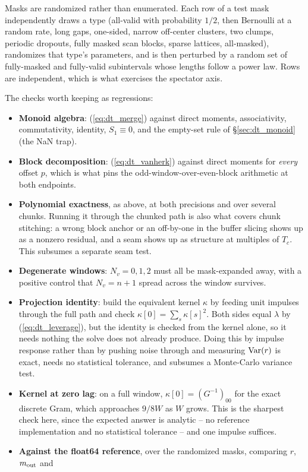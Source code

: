\documentclass{article}
\numberwithin{equation}{section}   %
\begin{document}
Masks are randomized rather than enumerated.  Each row of a test mask independently draws a type (all-valid with
probability $1/2$, then Bernoulli at a random rate, long gaps, one-sided, narrow off-center clusters, two
clumps, periodic dropouts, fully masked scan blocks, sparse lattices, all-masked), randomizes that type's
parameters, and is then perturbed by a random set of fully-masked and fully-valid subintervals whose lengths
follow a power law.  Rows are independent, which is what exercises the spectator axis.

The checks worth keeping as regressions:
\begin{itemize}
\item {\bf Monoid algebra}: (\ref{eq:dt_merge}) against direct moments, associativity, commutativity, identity,
$S_1 \equiv 0$, and the empty-set rule of \S\ref{sec:dt_monoid} (the NaN trap).
\item {\bf Block decomposition}: (\ref{eq:dt_vanherk}) against direct moments for {\em every} offset $p$, which
is what pins the odd-window-over-even-block arithmetic at both endpoints.
\item {\bf Polynomial exactness}, as above, at both precisions and over several chunks.  Running it through the
chunked path is also what covers chunk stitching: a wrong block anchor or an off-by-one in the buffer slicing
shows up as a nonzero residual, and a seam shows up as structure at multiples of $T_c$.  This subsumes a
separate seam test.
\item {\bf Degenerate windows}: $N_v = 0, 1, 2$ must all be mask-expanded away, with a positive control that
$N_v = n+1$ spread across the window survives.
\item {\bf Projection identity}: build the equivalent kernel $\kappa$ by feeding unit impulses through the full
path and check $\kappa[0] = \sum_s \kappa[s]^2$.  Both sides equal $\lambda$ by (\ref{eq:dt_leverage}), but the
identity is checked from the kernel alone, so it needs nothing the solve does not already produce.  Doing this
by impulse response rather than by pushing noise through and measuring ${\rm Var}(r)$ is exact, needs no
statistical tolerance, and subsumes a Monte-Carlo variance test.
\item {\bf Kernel at zero lag}: on a full window, $\kappa[0] = (G^{-1})_{00}$ for the exact discrete Gram, which
approaches $9/8W$ as $W$ grows.  This is the sharpest check here, since the expected answer is analytic -- no
reference implementation and no statistical tolerance -- and one impulse suffices.
\item {\bf Against the float64 reference}, over the randomized masks, comparing $r$, $m_{\rm out}$ and

\end{itemize}
\end{document}
